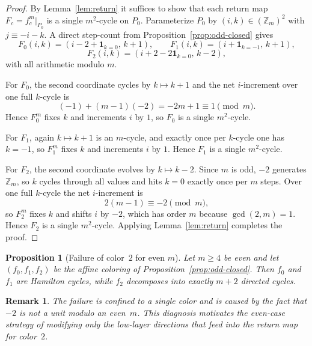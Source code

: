 \documentclass[11pt]{article}
\newtheorem{proposition}{Proposition}
\newtheorem{remark}{Remark}
\begin{document}
\begin{proof}
By Lemma~\ref{lem:return} it suffices to show that each return map $F_c=f_c^m|_{P_0}$ is a single $m^2$-cycle on $P_0$.
Parameterize $P_0$ by $(i,k)\in(\mathbb Z_m)^2$ with $j\equiv -i-k$.
A direct step-count from Proposition~\ref{prop:odd-closed} gives
\[
F_0(i,k)=(i-2+\mathbf 1_{k=0},\,k+1),\qquad
F_1(i,k)=(i+\mathbf 1_{k=-1},\,k+1),
\]
\[
F_2(i,k)=(i+2-2\mathbf 1_{k=0},\,k-2),
\]
with all arithmetic modulo $m$.

For $F_0$, the second coordinate cycles by $k\mapsto k+1$ and the net $i$-increment over one full $k$-cycle is
\[
(-1)+(m-1)(-2)=-2m+1\equiv 1\pmod m.
\]
Hence $F_0^m$ fixes $k$ and increments $i$ by $1$, so $F_0$ is a single $m^2$-cycle.

For $F_1$, again $k\mapsto k+1$ is an $m$-cycle, and exactly once per $k$-cycle one has $k=-1$, so $F_1^m$ fixes $k$ and increments $i$ by $1$.
Hence $F_1$ is a single $m^2$-cycle.

For $F_2$, the second coordinate evolves by $k\mapsto k-2$.
Since $m$ is odd, $-2$ generates $\mathbb Z_m$, so $k$ cycles through all values and hits $k=0$ exactly once per $m$ steps.
Over one full $k$-cycle the net $i$-increment is
\[
2(m-1)\equiv -2\pmod m,
\]
so $F_2^m$ fixes $k$ and shifts $i$ by $-2$, which has order $m$ because $\gcd(2,m)=1$.
Hence $F_2$ is a single $m^2$-cycle.
Applying Lemma~\ref{lem:return} completes the proof.
\end{proof}

\begin{proposition}[Failure of color~$2$ for even $m$]\label{prop:even-shatter}
Let $m\ge 4$ be even and let $(f_0,f_1,f_2)$ be the affine coloring of Proposition~\ref{prop:odd-closed}.
Then $f_0$ and $f_1$ are Hamilton cycles, while $f_2$ decomposes into exactly $m+2$ directed cycles.
\end{proposition}

\begin{remark}
The failure is confined to a single color and is caused by the fact that $-2$ is not a unit modulo an even~$m$.
This diagnosis motivates the even-case strategy of modifying only the low-layer directions that feed into the return map for color~$2$.
\end{remark}
\end{document}
